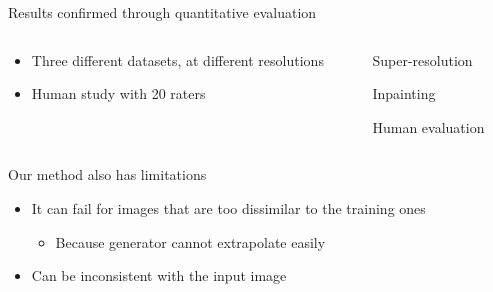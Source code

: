 \begin{frame}{Results confirmed through quantitative evaluation}

\begin{columns}[t]
 \begin{column}{0.5\textwidth}
\begin{itemize}
 \item Three different datasets, at different resolutions
 
 \vt
 
 \item Human study with 20 raters
 
 
\end{itemize}
  
 \end{column}
 \begin{column}{0.5\textwidth}
 \centering

Super-resolution\\

\vo

Inpainting\\

\vo

Human evaluation\\

\end{column}

 
\end{columns}




 
\end{frame}

\begin{frame}{Our method also has limitations}

\begin{itemize}
 \item It can fail for images that are too dissimilar to the training ones
 \begin{itemize}
 \item Because generator cannot extrapolate easily
 \end{itemize}
 \begin{center}
 \end{center}
 
 \item Can be inconsistent with the input image
 \begin{center}
 \end{center}
 
\end{itemize}
 
\end{frame}


